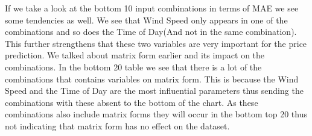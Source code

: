 \begin{table}[H]
\centering  %
\caption{The bottom 10 input combinations for price prediction} %
\label{table:Bottom10Prices} %
\end{table}

If we take a look at the bottom 10 input combinations in terms of MAE we see some tendencies as well. We see that Wind Speed only appears in one of the combinations and so does the Time of Day(And not in the same combination). This further strengthens that these two variables are very important for the price prediction. We talked about matrix form earlier and its impact on the combinations. In the bottom 20 table we see that there is a lot of the combinations that contains variables on matrix form. This is because the Wind Speed and the Time of Day are the most influential parameters thus sending the combinations with these absent to the bottom of the chart. As these combinations also include matrix forms they will occur in the bottom top 20 thus not indicating that matrix form has no effect on the dataset.


